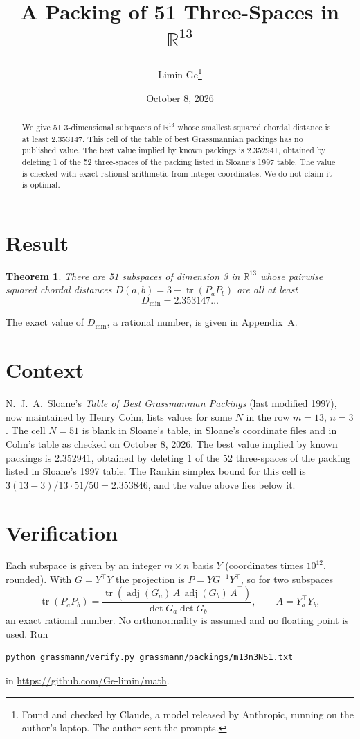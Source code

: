 \documentclass[11pt,a4paper]{article}
\title{A Packing of 51 Three-Spaces in $\mathbb{R}^{13}$}
\author{Limin Ge\thanks{Found and checked by Claude, a model released by Anthropic, running on the author's laptop. The author sent the prompts.}}
\date{October 8, 2026}
\newtheorem*{theorem}{Theorem}
\begin{document}
\maketitle
\begin{abstract}
We give 51 3-dimensional subspaces of $\mathbb{R}^{13}$ whose smallest squared chordal distance is at least 2.353147. This cell of the table of best Grassmannian packings has no published value. The best value implied by known packings is 2.352941, obtained by deleting 1 of the 52 three-spaces of the packing listed in Sloane's 1997 table. The value is checked with exact rational arithmetic from integer coordinates. We do not claim it is optimal.
\end{abstract}

\section{Result}
\begin{theorem}
There are 51 subspaces of dimension 3 in $\mathbb{R}^{13}$ whose pairwise squared chordal distances $D(a,b) = 3 - \operatorname{tr}(P_aP_b)$ are all at least
\[ D_{\min} = 2.353147\ldots \]
\end{theorem}
The exact value of $D_{\min}$, a rational number, is given in Appendix~A.


\section{Context}
N.~J.~A.~Sloane's \emph{Table of Best Grassmannian Packings} (last modified 1997), now maintained by Henry Cohn, lists values for some $N$ in the row $m=13$, $n=3$. The cell $N=51$ is blank in Sloane's table, in Sloane's coordinate files and in Cohn's table as checked on October 8, 2026. The best value implied by known packings is 2.352941, obtained by deleting 1 of the 52 three-spaces of the packing listed in Sloane's 1997 table. The Rankin simplex bound for this cell is $3(13-3)/13\cdot 51/50 = 2.353846$, and the value above lies below it.


\section{Verification}
Each subspace is given by an integer $m\times n$ basis $Y$ (coordinates times $10^{12}$, rounded). With $G=Y^\top Y$ the projection is $P=YG^{-1}Y^\top$, so for two subspaces
\[ \operatorname{tr}(P_aP_b)=\frac{\operatorname{tr}(\operatorname{adj}(G_a)\,A\,\operatorname{adj}(G_b)\,A^\top)}{\det G_a\det G_b},\qquad A=Y_a^\top Y_b, \]
an exact rational number. No orthonormality is assumed and no floating point is used. Run
\begin{verbatim}
python grassmann/verify.py grassmann/packings/m13n3N51.txt
\end{verbatim}
in \url{https://github.com/Ge-limin/math}.
\end{document}
